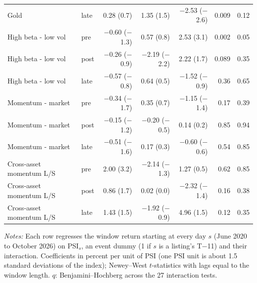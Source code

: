 \begin{table}[!htbp]
{\begin{threeparttable}
\begin{tabular}{llrrrrr}
Gold & late & 0.28 (0.7) & 1.35 (1.5) & $-$2.53 ($-$2.6) & 0.009 & 0.12 \\
High beta - low vol & pre & $-$0.60 ($-$1.3) & 0.57 (0.8) & 2.53 (3.1) & 0.002 & 0.05 \\
High beta - low vol & post & $-$0.26 ($-$0.9) & $-$2.19 ($-$2.2) & 2.22 (1.7) & 0.089 & 0.35 \\
High beta - low vol & late & $-$0.57 ($-$0.8) & 0.64 (0.5) & $-$1.52 ($-$0.9) & 0.36 & 0.65 \\
Momentum - market & pre & $-$0.34 ($-$1.7) & 0.35 (0.7) & $-$1.15 ($-$1.4) & 0.17 & 0.39 \\
Momentum - market & post & $-$0.15 ($-$1.2) & $-$0.20 ($-$0.5) & 0.14 (0.2) & 0.85 & 0.94 \\
Momentum - market & late & $-$0.51 ($-$1.6) & 0.17 (0.3) & $-$0.60 ($-$0.6) & 0.54 & 0.85 \\
Cross-asset momentum L/S & pre & 2.00 (3.2) & $-$2.14 ($-$1.3) & 1.27 (0.5) & 0.62 & 0.85 \\
Cross-asset momentum L/S & post & 0.86 (1.7) & 0.02 (0.0) & $-$2.32 ($-$1.4) & 0.16 & 0.38 \\
Cross-asset momentum L/S & late & 1.43 (1.5) & $-$1.92 ($-$0.9) & 4.96 (1.5) & 0.12 & 0.35 \\
\bottomrule
\end{tabular}
\begin{tablenotes}[flushleft]\footnotesize
\item \textit{Notes:} Each row regresses the window return starting at every day $s$ (June 2020 to October 2026) on PSI$_s$, an event dummy (1 if $s$ is a listing's T$-$11) and their interaction. Coefficients in percent per unit of PSI (one PSI unit is about 1.5 standard deviations of the index); Newey--West $t$-statistics with lags equal to the window length. $q$: Benjamini--Hochberg across the 27 interaction tests.
\end{tablenotes}
\end{threeparttable}
}
\end{table}
